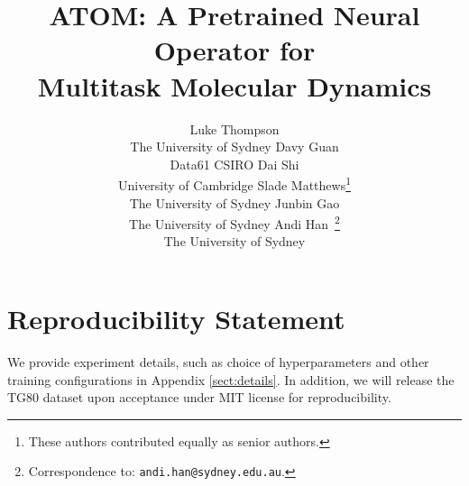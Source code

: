 \documentclass{article}
\title{ATOM: A Pretrained Neural Operator for\\ Multitask Molecular Dynamics}
\author{Luke Thompson \\
  The University of Sydney
  \And
  Davy Guan \\
  Data61 CSIRO 
  \And
  Dai Shi \\
  University of Cambridge
  \And
  Slade Matthews\thanks{These authors contributed equally as senior authors.} \\
  The University of Sydney 
  \And
  Junbin Gao\footnotemark[1] \\
  The University of Sydney 
  \And
  Andi Han\footnotemark[1] \ \thanks{Correspondence to: \texttt{andi.han@sydney.edu.au}.} \\
  The University of Sydney 
}
\begin{document}
\maketitle
\thispagestyle{fancy}
\pagestyle{fancy}



\section*{Reproducibility Statement}
We provide experiment details, such as choice of hyperparameters and other training configurations in Appendix \ref{sect:details}. In addition, we will release the TG80 dataset upon acceptance under MIT license for reproducibility.
\newpage




\appendix

\end{document}
